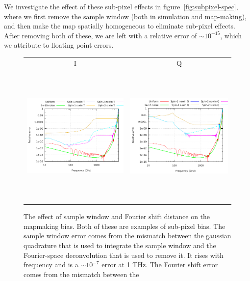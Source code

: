 \documentclass{article}
\begin{document}
We investigate the effect of these sub-pixel effects in
figure~\ref{fig:subpixel-spec}, where we first remove the
sample window (both in simulation and map-making), and then
make the map spatially homogeneous to eliminate sub-pixel effects.
After removing both of these, we are left with a relative error of
$\sim10^{-15}$, which we attribute to floating point errors.
\begin{figure}
	\centering
	\hspace*{-2mm}\begin{tabular}{cc}
		I & Q \\
		\includegraphics[height=70mm,clip,trim=0 0 0 0]{plots/spec_error_rel_v4_log_log_spin_win_T.pdf} &
		\includegraphics[height=70mm,clip,trim=30mm 0 0 0]{plots/spec_error_rel_v4_log_log_spin_win_Q.pdf}
	\end{tabular}
	\caption{The effect of sample window and Fourier shift distance on the
	mapmaking bias. Both of these are examples of sub-pixel bias. The sample
	window error comes from the mismatch between the gaussian quadrature that is
	used to integrate the sample window and the Fourier-space deconvolution that
	is used to remove it. It rises with frequency and is a $\sim 10^{-7}$ error
	at 1 THz. The Fourier shift error comes from the mismatch between the
}
\end{figure}
\end{document}
